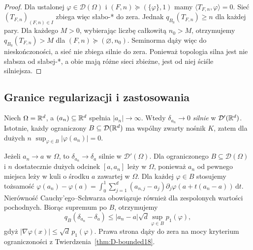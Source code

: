 \begin{proof}
Dla ustalonej $\varphi\in\mathcal D(\Omega)$ i
$(F,n)\succeq(\{\varphi\},1)$ mamy
$\langle T_{F,n},\varphi\rangle=0$. Sieć
$(T_{F,n})_{(F,n)\in I}$ zbiega więc słabo-* do zera.
Jednak $q_{B_0}(T_{F,n})\ge n$ dla każdej pary.
Dla każdego $M>0$, wybierając liczbę całkowitą $n_0>M$,
otrzymujemy $q_{B_0}(T_{F,n})>M$ dla
$(F,n)\succeq(\varnothing,n_0)$. Seminorma dąży więc
do nieskończoności, a sieć nie zbiega silnie do zera. Ponieważ topologia silna
jest nie słabsza od słabej-*, a obie mają różne sieci zbieżne,
jest od niej ściśle silniejsza.
\end{proof}

\subsection{Granice regularizacji i zastosowania}

\begin{przyklad}
\label{ex:delta-escape19}
Niech $\Omega=\mathbb R^d$, a $(a_n)\subseteq\mathbb R^d$
spełnia $|a_n|\to\infty$. Wtedy $\delta_{a_n}\to0$
\emph{silnie} w $\mathcal D'(\mathbb R^d)$.
Istotnie, każdy ograniczony $B\subseteq\mathcal D(\mathbb R^d)$
ma wspólny zwarty nośnik $K$, zatem dla dużych $n$
$\sup_{\varphi\in B}|\varphi(a_n)|=0$.
\end{przyklad}

\begin{przyklad}
\label{ex:delta-continuity19}
Jeżeli $a_n\to a$ w $\Omega$, to
$\delta_{a_n}\to\delta_a$ silnie w $\mathcal D'(\Omega)$.
Dla ograniczonego $B\subseteq\mathcal D(\Omega)$
i $n$ dostatecznie dużych odcinek $[a,a_n]$ leży
w $\Omega$, ponieważ $a_n$ od pewnego miejsca
leży w kuli o środku $a$ zawartej w $\Omega$.
Dla każdej $\varphi\in B$ stosujemy tożsamość
$\varphi(a_n)-\varphi(a)=\int_0^1
\sum_{j=1}^d(a_{n,j}-a_j)\partial_j\varphi(a+t(a_n-a))\,
\mathrm dt$.
Nierówność Cauchy'ego--Schwarza obowiązuje również
dla zespolonych wartości pochodnych. Biorąc supremum po $B$,
otrzymujemy
\[q_B(\delta_{a_n}-\delta_a)\le
|a_n-a|\sqrt d\sup_{\varphi\in B}p_1(\varphi),
\]
gdyż $|\nabla\varphi(x)|\le\sqrt d\,p_1(\varphi)$.
Prawa strona dąży do zera na mocy kryterium
ograniczoności z Twierdzenia~\ref{thm:D-bounded18}.
\end{przyklad}


